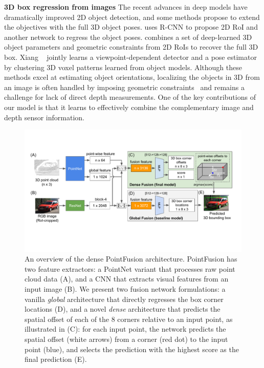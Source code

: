 \documentclass[10pt,twocolumn,letterpaper]{article}
\begin{document}
\textbf{3D box regression from images}
The recent advances in deep models have dramatically improved 2D object detection, and some methods propose to extend the objectives with the full 3D object poses. \cite{tulsiani2015viewpoints} uses R-CNN to propose 2D RoI and another network to regress the object poses.  \cite{mousavian20163d} combines a set of deep-learned 3D object parameters and geometric constraints from 2D RoIs to recover the full 3D box. Xiang \etal~\cite{subcnn,xiang2015data} jointly learns a viewpoint-dependent detector and a pose estimator by clustering 3D voxel patterns learned from object models. Although these methods excel at estimating object orientations, localizing the objects in 3D from an image is often handled by imposing geometric constraints~\cite{mousavian20163d} and remains a challenge for lack of direct depth measurements. One of the key contributions of our model is that it learns to effectively combine the complementary image and depth sensor information. 
\begin{figure}[t!]
\centering
\includegraphics[width=0.95\linewidth]{model-v5.pdf}
\caption{An overview of the dense PointFusion architecture. PointFusion has two feature extractors: a PointNet variant that processes raw point cloud data (A), and a CNN that extracts visual features from an input image (B). We present two fusion network formulations: a vanilla \textit{global} architecture that directly regresses the box corner locations (D), and a novel \textit{dense} architecture that predicts the spatial offset of each of the 8 corners relative to an input point, as illustrated in (C): for each input point, the network predicts the spatial offset (white arrows) from a corner (red dot) to the input point (blue), and selects the prediction with the highest score as the final prediction (E).}
\label{fig:model}
\end{figure}
\end{document}
